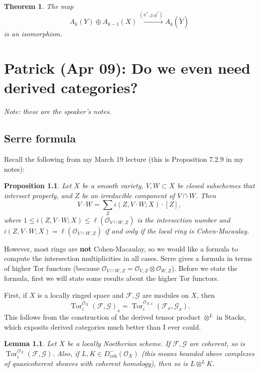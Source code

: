 \documentclass[leqno, openany]{memoir}
\newtheorem{thm}{Theorem}[section]
\newtheorem{lem}[thm]{Lemma}
\theoremstyle{definition}
\theoremstyle{remark}
\theoremstyle{plain}
\newtheorem*{prop*}{Proposition}
\theoremstyle{definition}
\theoremstyle{remark}
\newcommand{\mc}[1]{\mathcal{#1}}
\newcommand{\mr}[1]{\mathrm{#1}}
\newcommand{\wt}[1]{\widetilde{#1}}
\DeclareMathOperator{\Tor}{Tor}
\begin{document}
\begin{thm} The map \[ A_k(Y) \oplus A_{k-1}(X) \xrightarrow{(\pi^*, j_* g^*)}
A_k(\wt{Y}) \] is an isomorphism.  \end{thm}

\chapter{Patrick (Apr 09): Do we even need derived categories?}%
\label{cha:patrick_apr_09_serre_intersection_formula}

\textit{Note: these are the speaker's notes}.

\section{Serre formula}%

Recall the following from my March 19 lecture (this is Proposition 7.2.9 in my
notes): \begin{prop*} Let $X$ be a smooth variety, $V, W \subset X$ be closed
    subschemes that intersect properly, and $Z$ be an irreducible component of
    $V \cap W$. Then \[ V \cdot W = \sum_Z i(Z, V \cdot W; X) \cdot [Z], \]
    where $1 \leq i(Z, V \cdot W; X) \leq \ell(\mc{O}_{V \cap W, Z})$ is the
    intersection number and $i(Z, V \cdot W; X) = \ell(\mc{O}_{V \cap W, Z})$
    if and only if the local ring is Cohen-Macaulay.  \end{prop*}

However, most rings are \textbf{not} Cohen-Macaulay, so we would like a formula
to compute the intersection multiplicities in all cases. Serre gives a formula
in terms of higher Tor functors (because $\mc{O}_{V \cap W, Z} = \mc{O}_{V, Z}
\otimes \mc{O}_{W, Z}$). Before we state the formula, first we will state some
results about the higher Tor functors. 

First, if $X$ is a locally ringed space and $\mc{F}, \mc{G}$ are modules on
$X$, then \[ {\Tor_i^{\mc{O}_X}(\mc{F}, \mc{G})}_x =
\Tor_i^{\mc{O}_{X,x}}(\mc{F}_x, \mc{G}_x). \] This follows from the
construction of the derived tensor product $\otimes^L$ in Stacks, which
exposits derived categories much better than I ever could.

\begin{lem} Let $X$ be a locally Noetherian scheme. If $\mc{F}, \mc{G}$ are
    coherent, so is $\Tor_i^{\mc{O}_X}(\mc{F}, \mc{G})$. Also, if $L, K \in
    D^-_{\mr{coh}}(\mc{O}_X)$ (this means bounded above complexes of
    quasicoherent sheaves with coherent homology), then so is $L \otimes^L K$.
\end{lem}
\end{document}
